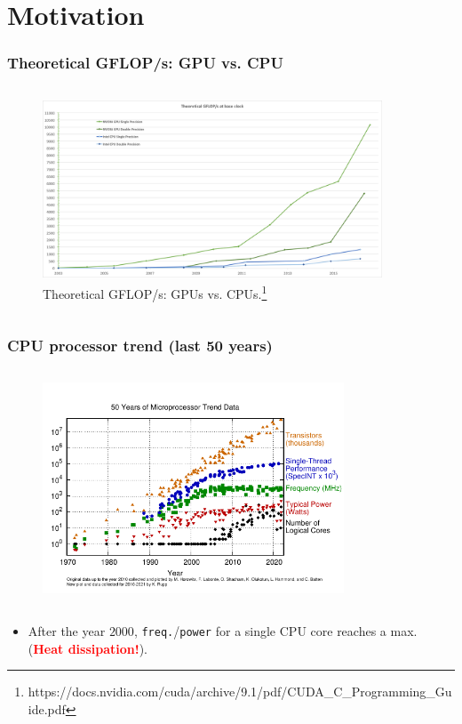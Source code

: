 \section{Motivation}   %

\begin{frame}
  \frametitle{Theoretical GFLOP/s: GPU vs. CPU}	
  \begin{columns}
    \begin{figure}[H]
       \centering
            \includegraphics[width=0.90\textwidth]{./img/theoretical-gflops.png}
	    \caption{\small{Theoretical GFLOP/s: GPUs vs. CPUs.\newline\footnote{https://docs.nvidia.com/cuda/archive/9.1/pdf/CUDA\_C\_Programming\_Guide.pdf}}}
     \end{figure}
     \end{columns}

\end{frame}	

\begin{frame}
	\frametitle{CPU processor trend (last 50 years)}
  \begin{columns}
    \begin{figure}[H]
       \centering
            \includegraphics[width=0.80\textwidth]{./img/50-years-processor-trend.pdf}
     \end{figure}
     \end{columns} 
      \begin{itemize} 
         \item After the year $2000$, \texttt{freq.}/\texttt{power} 
		 for a single CPU core reaches a max. (\textcolor{red}{\textbf{Heat dissipation!}}).
      \end{itemize}
\end{frame} 

